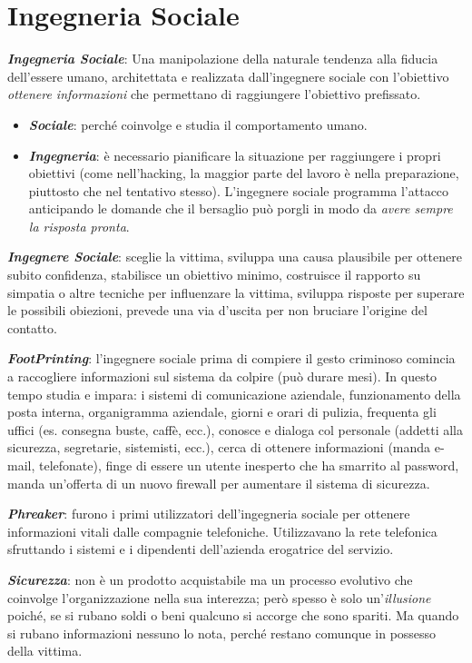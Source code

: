 \documentclass[a4paper, notitlepage, 9pt]{extreport}
\begin{document}
\chapter*{Ingegneria Sociale}
\textit{\textbf{Ingegneria Sociale}}: Una manipolazione della naturale tendenza alla fiducia dell’essere umano, architettata e realizzata dall’ingegnere sociale con l’obiettivo \textit{ottenere informazioni} che permettano di raggiungere l'obiettivo prefissato.
\begin{itemize}
	\item \textit{\textbf{Sociale}}: perché coinvolge e studia il comportamento umano.
	\item \textit{\textbf{Ingegneria}}: è necessario pianificare la situazione per raggiungere i propri obiettivi (come nell’hacking, la maggior parte del lavoro è nella preparazione, piuttosto che nel tentativo stesso). L’ingegnere sociale programma l’attacco anticipando le domande che il bersaglio può porgli in modo da \textit{avere sempre la risposta pronta}.
\end{itemize}
\textit{\textbf{Ingegnere Sociale}}: sceglie la vittima, sviluppa una causa plausibile per ottenere subito confidenza, stabilisce un obiettivo minimo, costruisce il rapporto su simpatia o altre tecniche per influenzare la vittima, sviluppa risposte per superare le possibili obiezioni, prevede una via d'uscita per non bruciare l'origine del contatto.

\noindent
\textit{\textbf{FootPrinting}}: l’ingegnere sociale prima di compiere il gesto criminoso comincia a raccogliere informazioni sul sistema da colpire (può durare mesi). In questo tempo studia e impara: i sistemi di comunicazione aziendale, funzionamento della posta interna, organigramma aziendale, giorni e orari di pulizia, frequenta gli uffici (es. consegna buste, caffè, ecc.), conosce e dialoga col personale (addetti alla sicurezza, segretarie, sistemisti, ecc.), cerca di ottenere informazioni (manda e-mail, telefonate), finge di essere un utente inesperto che ha smarrito al password, manda un'offerta di un nuovo firewall per aumentare il sistema di sicurezza.

\noindent
\textit{\textbf{Phreaker}}: furono i primi utilizzatori dell'ingegneria sociale per ottenere informazioni vitali dalle compagnie telefoniche. Utilizzavano la rete telefonica
sfruttando i sistemi e i dipendenti dell’azienda erogatrice del servizio.

\noindent
\textit{\textbf{Sicurezza}}: non è un prodotto acquistabile ma un processo evolutivo che coinvolge l’organizzazione nella sua interezza; però spesso è solo un'\textit{illusione} poiché, se si rubano soldi o beni qualcuno si accorge che
sono spariti. Ma quando si rubano informazioni nessuno lo nota, perché restano comunque in possesso della vittima.
\end{document}
